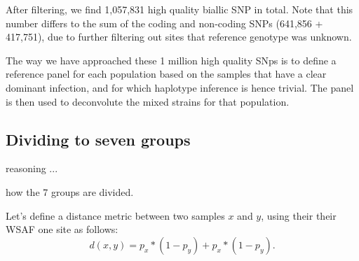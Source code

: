 \documentclass{article}
\begin{document}
After filtering, we find 1,057,831 high quality biallic SNP in total. Note that this number differs to the sum of the coding and non-coding SNPs (641,856 + 417,751), due to further filtering out sites that reference genotype was unknown. %

The way we have approached these 1 million high quality SNps is to define a reference panel for each population based on the samples that have a clear dominant infection, and for which haplotype inference is hence trivial.  The panel is then used to deconvolute the mixed strains for that population.

\subsection{Dividing to seven groups}


reasoning ...

how the 7 groups are divided.


Let's define a distance metric between two samples $x$ and $y$, using their their WSAF one site as follows:
$$d(x, y) = p_{x} * (1-p_{y}) + p_{x} * (1-p_{y}).$$
\end{document}
